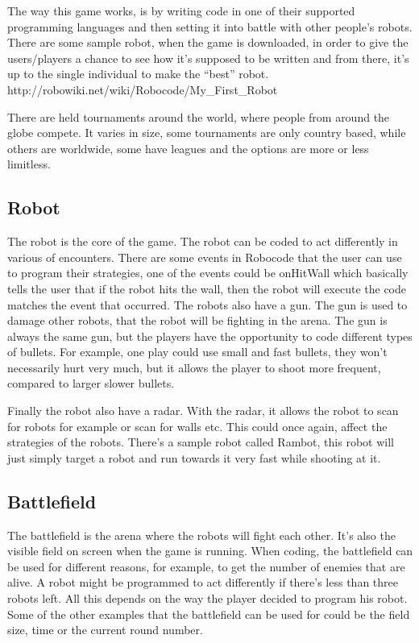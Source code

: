 The way this game works, is by writing code in one of their supported programming languages and then setting it into battle with other people’s robots. There are some sample robot, when the game is downloaded, in order to give the users/players a chance to see how it’s supposed to be written and from there, it’s up to the single individual to make the “best” robot. http://robowiki.net/wiki/Robocode/My\_First\_Robot

There are held tournaments around the world, where people from around the globe compete. It varies in size, some tournaments are only country based, while others are worldwide, some have leagues and the options are more or less limitless. \citep{rc}
  
\subsection{Robot}
The robot is the core of the game. The robot can be coded to act differently in various of encounters. There are some events in Robocode that the user can use to program their strategies, one of the events could be onHitWall which basically tells the user that if the robot hits the wall, then the robot will execute the code matches the event that occurred. The robots also have a gun. The gun is used to damage other robots, that the robot will be fighting in the arena. The gun is always the same gun, but the players have the opportunity to code different types of bullets. For example, one play could use small and fast bullets, they won’t necessarily hurt very much, but it allows the player to shoot more frequent, compared to larger slower bullets. 

Finally the robot also have a radar. With the radar, it allows the robot to scan for robots for example or scan for walls etc. This could once again, affect the strategies of the robots. There’s a sample robot called Rambot, this robot will just simply target a robot and run towards it very fast while shooting at it. 

\subsection{Battlefield}
The battlefield is the arena where the robots will fight each other. It’s also the visible field on screen when the game is running. When coding, the battlefield can be used for different reasons, for example, to get the number of enemies that are alive. A robot might be programmed to act differently if there’s less than three robots left. All this depends on the way the player decided to program his robot. Some of the other examples that the battlefield can be used for could be the field size, time or the current round number. 

